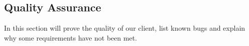 \subsection{Quality Assurance}
In this section will prove the quality of our client,  list known bugs and explain why some requirements have not been met.



\newpage